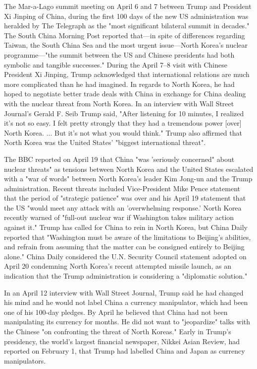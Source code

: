 The Mar-a-Lago summit meeting on April 6 and 7 between Trump and
President Xi Jinping of China, during the first 100 days of the new US
administration was heralded by The Telegraph as the "most significant
bilateral summit in decades." The South China Morning Post reported
that---in spite of differences regarding Taiwan, the South China Sea and
the most urgent issue---North Korea's nuclear programme---"the summit
between the US and Chinese presidents had both symbolic and tangible
successes." During the April 7--8 visit with Chinese President Xi
Jinping, Trump acknowledged that international relations are much more
complicated than he had imagined. In regards to North Korea, he had
hoped to negotiate better trade deals with China in exchange for China
dealing with the nuclear threat from North Korea. In an interview with
Wall Street Journal's Gerald F. Seib Trump said, "After listening for 10
minutes, I realized it's not so easy. I felt pretty strongly that they
had a tremendous power {[}over{]} North Korea. ... But it's not what you
would think." Trump also affirmed that North Korea was the United
States' "biggest international threat".

The BBC reported on April 19 that China "was 'seriously concerned" about
nuclear threats" as tensions between North Korea and the United States
escalated with a "war of words" between North Korea's leader Kim Jong-un
and the Trump administration. Recent threats included Vice-President
Mike Pence statement that the period of "strategic patience" was over
and his April 19 statement that the US "would meet any attack with an
'overwhelming response.' North Korea recently warned of "full-out
nuclear war if Washington takes military action against it." Trump has
called for China to rein in North Korea, but China Daily reported that
"Washington must be aware of the limitations to Beijing's abilities, and
refrain from assuming that the matter can be consigned entirely to
Beijing alone." China Daily considered the U.N. Security Council
statement adopted on April 20 condemning North Korea's recent attempted
missile launch, as an indication that the Trump administration is
considering a "diplomatic solution."

In an April 12 interview with Wall Street Journal, Trump said he had
changed his mind and he would not label China a currency manipulator,
which had been one of his 100-day pledges. By April he believed that
China had not been manipulating its currency for months. He did not want
to "jeopardize" talks with the Chinese "on confronting the threat of
North Koreas." Early in Trump's presidency, the world's largest
financial newspaper, Nikkei Asian Review, had reported on February 1,
that Trump had labelled China and Japan as currency manipulators.

